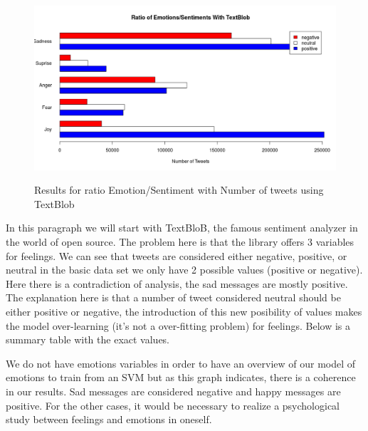 \documentclass{acmtog} %
\begin{document}
\begin{figure}[h!]
{\includegraphics[width=\linewidth]{ratio-textblob.png}}
\caption{Results for ratio Emotion/Sentiment with Number of tweets using TextBlob}
  \label{fig:contradiction_barplot}
\end{figure}

In this paragraph we will start with TextBloB, the famous sentiment analyzer in the world of open source. The problem here is that the library offers 3 variables for feelings. We can see that tweets are considered either negative, positive, or neutral in the basic data set we only have 2 possible values ​​(positive or negative). Here there is a contradiction of analysis, the sad messages are mostly positive. The explanation here is that a number of tweet considered neutral should be either positive or negative, the introduction of this new posibility of values ​​makes the model over-learning (it's not a over-fitting problem) for feelings. Below is a summary table with the exact values.

\begin{table}[H]
\label{tab:cross_tab_TextBLOB}
\end{table}


We do not have emotions variables in order to have an overview of our model of emotions to train from an SVM but as this graph indicates, there is a coherence in our results. Sad messages are considered negative and happy messages are positive. For the other cases, it would be necessary to realize a psychological study between feelings and emotions in oneself.
\end{document}
